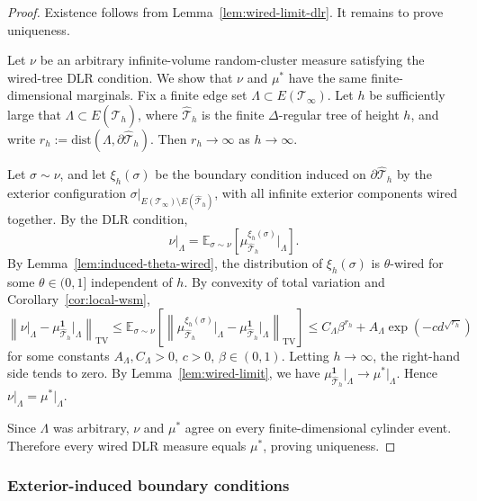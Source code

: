 \documentclass[11pt]{amsart}
\theoremstyle{plain}
\theoremstyle{definition}
\theoremstyle{remark}
\newcommand{\dreg}{\widehat {\mathcal T}_h}
\newcommand{\dist}{\mathrm{dist}}
\begin{document}
\begin{proof}
Existence follows from Lemma~\ref{lem:wired-limit-dlr}. It remains to prove uniqueness.

Let $\nu$ be an arbitrary infinite-volume random-cluster measure satisfying the wired-tree DLR condition. We show that $\nu$ and $\mu^*$ have the same finite-dimensional marginals. 
Fix a finite edge set $\Lambda\subset E(\mathcal T_\infty)$. Let $h$ be sufficiently large that $\Lambda\subset E(\dreg)$, where $\dreg$ is the finite $\Delta$-regular tree of height $h$, and write $r_h:=\dist(\Lambda,\partial\dreg)$. Then $r_h\to\infty$ as $h\to\infty$. 

Let $\sigma\sim\nu$, and let $\xi_h(\sigma)$ be the boundary condition induced on $\partial\dreg$ by the exterior configuration $\sigma\vert_{E(\mathcal T_\infty)\setminus E(\dreg)}$, with all infinite exterior components wired together. By the DLR condition,
\[
    \nu\vert_\Lambda
    =
    \mathbb E_{\sigma\sim\nu}
    \left[
        \mu_{\dreg}^{\xi_h(\sigma)}
        \vert_\Lambda
    \right].
\]
By Lemma~\ref{lem:induced-theta-wired}, the distribution of $\xi_h(\sigma)$ is $\theta$-wired for some $\theta\in(0,1]$ independent of $h$. By convexity of total variation and Corollary~\ref{cor:local-wsm},
\[
    \left\|
        \nu\vert_\Lambda
        -
        \mu_{\dreg}^{\mathbf 1}\vert_\Lambda
    \right\|_{\mathrm{TV}}
    \le
    \mathbb E_{\sigma\sim\nu}
    \left[
        \left\|
            \mu_{\dreg}^{\xi_h(\sigma)}\vert_\Lambda
            -
            \mu_{\dreg}^{\mathbf 1}\vert_\Lambda
        \right\|_{\mathrm{TV}}
    \right]
    \le
    C_\Lambda\beta^{r_h}
    +
    A_\Lambda
    \exp\left(
        -c d^{\sqrt{r_h}}
    \right)
\]
for some constants $A_\Lambda,C_\Lambda>0$, $c>0$, $\beta\in(0,1)$. Letting $h\to\infty$, the right-hand side tends to zero. By Lemma~\ref{lem:wired-limit}, we have $\mu_{\dreg}^{\mathbf 1}\vert_\Lambda\longrightarrow\mu^*\vert_\Lambda$. Hence $\nu\vert_\Lambda=\mu^*\vert_\Lambda$.

Since $\Lambda$ was arbitrary, $\nu$ and $\mu^*$ agree on every finite-dimensional cylinder event. Therefore every wired DLR measure equals $\mu^*$, proving uniqueness.
\end{proof}

\subsubsection{Exterior-induced boundary conditions}
\label{subsec:exterior-induced-boundary}
\end{document}
